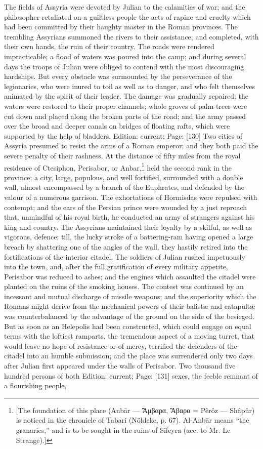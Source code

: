 The fields of Assyria were devoted by Julian to the calamities of war; and the philosopher retaliated on a guiltless people the acts of rapine and cruelty which had been committed by their haughty master in the Roman provinces. The trembling Assyrians summoned the rivers to their assistance; and completed, with their own hands, the ruin of their country. The roads were rendered impracticable; a flood of waters was poured into the camp; and during several days the troops of Julian were obliged to contend with the most discouraging hardships. But every obstacle was surmounted by the perseverance of the legionaries, who were inured to toil as well as to danger, and who felt themselves animated by the spirit of their leader. The damage was gradually repaired; the waters were restored to their proper channels; whole groves of palm-trees were cut down and placed along the broken parts of the road; and the army passed over the broad and deeper canals on bridges of floating rafts, which were supported by the help of bladders. Edition: current; Page: [130] Two cities of Assyria presumed to resist the arms of a Roman emperor: and they both paid the severe penalty of their rashness. At the distance of fifty miles from the royal residence of Ctesiphon, Perisabor, or Anbar,\footnote{[The foundation of this place (Anbār \texthebrew{—} \textgreek{\texthebrew{Ἄ}μβαρα, \texthebrew{Ἄ}βαρα} = Pêrôz \texthebrew{—} Shâpûr) is noticed in the chronicle of Tabari (Nöldeke, p. 67). Al-Anbār means \texthebrew{“}the granaries,\texthebrew{}” and is to be sought in the ruins of Sifeyra (acc. to Mr. Le Strange).]} held the second rank in the province; a city, large, populous, and well fortified, surrounded with a double wall, almost encompassed by a branch of the Euphrates, and defended by the valour of a numerous garrison. The exhortations of Hormisdas were repulsed with contempt; and the ears of the Persian prince were wounded by a just reproach that, unmindful of his royal birth, he conducted an army of strangers against his king and country. The Assyrians maintained their loyalty by a skilful, as well as vigorous, defence; till, the lucky stroke of a battering-ram having opened a large breach by shattering one of the angles of the wall, they hastily retired into the fortifications of the interior citadel. The soldiers of Julian rushed impetuously into the town, and, after the full gratification of every military appetite, Perisabor was reduced to ashes; and the engines which assaulted the citadel were planted on the ruins of the smoking houses. The contest was continued by an incessant and mutual discharge of missile weapons; and the superiority which the Romans might derive from the mechanical powers of their balistæ and catapultæ was counterbalanced by the advantage of the ground on the side of the besieged. But as soon as an Helepolis had been constructed, which could engage on equal terms with the loftiest ramparts, the tremendous aspect of a moving turret, that would leave no hope of resistance or of mercy, terrified the defenders of the citadel into an humble submission; and the place was surrendered only two days after Julian first appeared under the walls of Perisabor. Two thousand five hundred persons of both Edition: current; Page: [131] sexes, the feeble remnant of a flourishing people, 